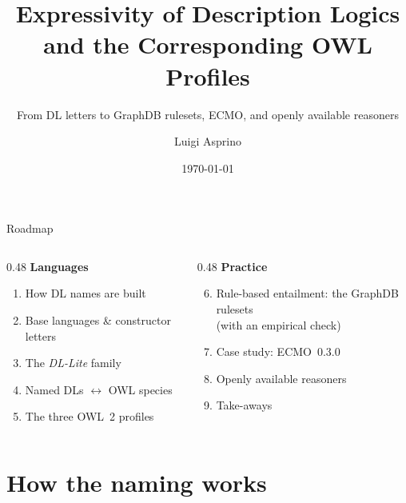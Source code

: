 \documentclass[10pt,aspectratio=169,xcolor=table]{beamer}
\title{Expressivity of Description Logics\\and the Corresponding OWL Profiles}
\subtitle{From DL letters to GraphDB rulesets, ECMO, and openly available reasoners}
\author{Luigi Asprino}
\institute{JRC --- Reasoning notes}
\date{\today}
\newcommand{\dlliteplain}{\textit{DL-Lite}}
\begin{document}
\maketitle

\begin{frame}{Roadmap}
  \begin{columns}[T]
    \begin{column}{0.48\textwidth}
      \textbf{Languages}
      \begin{enumerate}
        \item How DL names are built
        \item Base languages \& constructor letters
        \item The \dlliteplain{} family
        \item Named DLs $\leftrightarrow$ OWL species
        \item The three OWL~2 profiles
      \end{enumerate}
    \end{column}
    \begin{column}{0.48\textwidth}
      \textbf{Practice}
      \begin{enumerate}\setcounter{enumi}{5}
        \item Rule-based entailment: the GraphDB rulesets\\
          {\small (with an empirical check)}
        \item Case study: ECMO~0.3.0
        \item Openly available reasoners
        \item Take-aways
      \end{enumerate}
    \end{column}
  \end{columns}
\end{frame}

\section{How the naming works}
\end{document}
